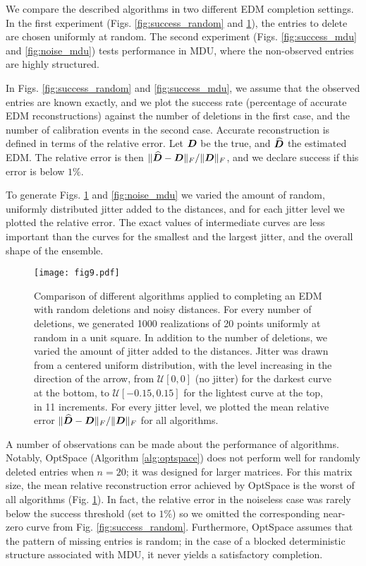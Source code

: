 \documentclass[10pt,double]{IEEEtran}
\providecommand{\wh}[1]{\ensuremath{\widehat{#1}}}
\newcommand{\rev}[1]{{#1}}
\begin{document}
We compare the described algorithms in two different EDM completion settings.
In the first experiment (Figs. \ref{fig:success_random} and
\ref{fig:noise_random}), the entries to delete are chosen uniformly at random.
The second experiment (Figs. \ref{fig:success_mdu} and \ref{fig:noise_mdu})
tests performance in MDU, where the non-observed entries are highly
structured. \rev{In Figs. \ref{fig:success_random} and \ref{fig:success_mdu}, we
assume that the observed entries are known exactly, and we plot the success
rate (percentage of accurate EDM reconstructions) against the number of
deletions in the first case, and the number of calibration events in the
second case. Accurate reconstruction is defined in terms of the relative
error. Let $\boldsymbol{D}$ be the true, and $\wh{\mD}$ the estimated EDM. The relative
error is then ${\| \wh{\mD} - \mD \|_F}/{\|\mD\|_F}$, and we declare success if
this error is below $1\%$.

To generate Figs. \ref{fig:noise_random} and \ref{fig:noise_mdu} we varied the
amount of random, uniformly distributed jitter added to the distances, and for
each jitter level we plotted the relative error. The exact values of
intermediate curves are less important than the curves for the smallest and
the largest jitter, and the overall shape of the ensemble.

\begin{figure}[t!]
\centering
\texttt{[image: fig9.pdf]}
\caption{\rev{Comparison of different algorithms applied to completing an EDM with
random deletions and noisy distances. For every number of deletions, we
generated 1000 realizations of 20 points uniformly at random in a unit square.
In addition to the number of deletions, we varied the amount of jitter added
to the distances. Jitter was drawn from a centered uniform distribution, with
the level increasing in the direction of the arrow, from $\mathcal{U}[0, 0]$
(no jitter) for the darkest curve at the bottom, to $\mathcal{U}[-0.15, 0.15]$
for the lightest curve at the top, in 11 increments. For every jitter level,
we plotted the mean relative error $\|\wh{\mD}
- \mD \|_F / \|\mD \|_F$ for all algorithms.}}
\label{fig:noise_random}
\end{figure}

A number of observations can be made about the performance of algorithms.
Notably, OptSpace (Algorithm \ref{alg:optspace}) does not perform well
for randomly deleted entries when $n = 20$; it was designed for larger
matrices. For this matrix size, the mean relative reconstruction error
achieved by OptSpace is the worst of all algorithms (Fig.
\ref{fig:noise_random}). In fact, the relative error in the noiseless case was
rarely below the success threshold (set to $1
\%$) so we omitted the corresponding near-zero curve from Fig.
\ref{fig:success_random}. Furthermore, OptSpace assumes that the pattern of
missing entries is random; in the case of a blocked deterministic structure
associated with MDU, it never yields a satisfactory completion.

}
\end{document}
